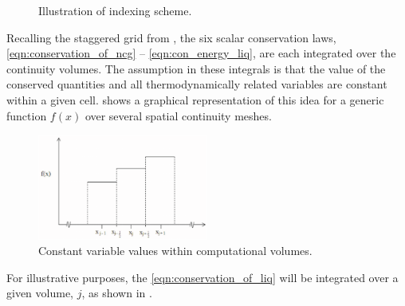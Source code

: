 \begin{figure}[ht]
\caption{Illustration of indexing scheme.}
\label{fig:vertical_pipe_with_cells}
\begin{center}
\end{center}
\end{figure}

Recalling the staggered grid from , the six scalar conservation laws, \eqref{eqn:conservation_of_ncg} -- \eqref{eqn:con_energy_liq}, are each integrated over the continuity volumes.
The assumption in these integrals is that the value of the conserved quantities and all thermodynamically related variables are constant within a given cell.
 shows a graphical representation of this idea for a generic function $f(x)$ over several spatial continuity meshes.

\begin{figure}[ht]
\caption{Constant variable values within computational volumes.}
\label{fig:constant_value}
\begin{center}
\includegraphics[width=0.5\textwidth]{images/constant_value.eps}
\end{center}
\end{figure}

For illustrative purposes,  the \eqref{eqn:conservation_of_liq} will be integrated over a given volume, $j$, as shown in .

